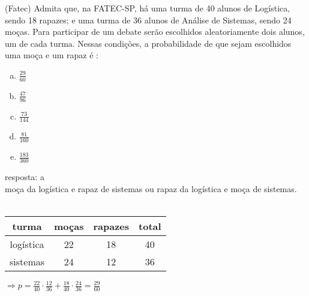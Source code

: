 \begin{ex}
   (Fatec) Admita que, na FATEC-SP, há uma turma de 40 alunos de Logística, sendo 18 rapazes; e uma turma de 36 alunos de Análise de Sistemas, sendo 24 moças. Para participar de um debate serão escolhidos aleatoriamente dois alunos, um de cada turma. Nessas condições, a probabilidade de que sejam escolhidos uma moça e um rapaz é :
      \begin{enumerate}  [(a)]
          \item $\frac{29}{60}$
          \item $\frac{47}{96}$
          \item $\frac{73}{144}$
          \item $\frac{81}{160}$
          \item $\frac{183}{360}$
      \end{enumerate}
        \begin{sol}
        resposta: a \\
        moça da logística e rapaz de sistemas ou rapaz da logística e moça de sistemas.\\ \\
         \begin{tabular}{|c|c|c|c|} \hline
        turma & moças & rapazes & total  \\  \hline
        logística & 22 & 18 & 40  \\ \hline
        sistemas & 24 & 12 & 36 \\ \hline
         \end{tabular}
         $\Longrightarrow p = \frac{22}{40}\cdot\frac{12}{36}+\frac{18}{40}\cdot\frac{24}{36}=\frac{29}{60}$
        \end{sol}
 \end{ex}
